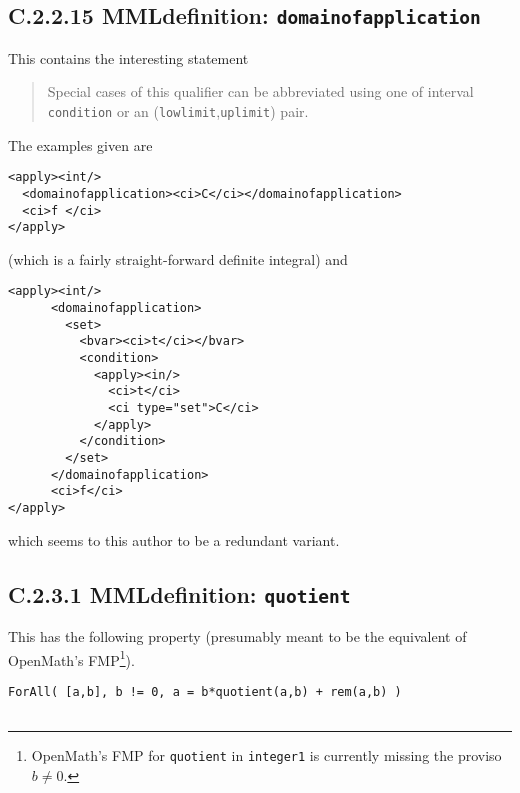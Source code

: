 \documentclass{llncs}
\begin{document}
{\subsection{C.2.2.15 MMLdefinition: {\tt domainofapplication}}\label{C2215}
This contains the interesting statement
\begin{quotation}\noindent
Special cases of this qualifier can be abbreviated using one of interval
{\tt condition} or an ({\tt lowlimit},{\tt uplimit}) pair.
\end{quotation}
The examples given are
\begin{lstlisting}[language=MathML2]
<apply><int/>
  <domainofapplication><ci>C</ci></domainofapplication>
  <ci>f </ci>
</apply>
\end{lstlisting}
(which is a fairly straight-forward definite integral) and
\begin{lstlisting}[language=MathML2]
<apply><int/>
      <domainofapplication>
        <set>
          <bvar><ci>t</ci></bvar>
          <condition>
            <apply><in/>
              <ci>t</ci>
              <ci type="set">C</ci>
            </apply>
          </condition>
        </set>
      </domainofapplication>
      <ci>f</ci>
</apply>
\end{lstlisting}
which seems to this author to be a redundant variant. 
\subsection{C.2.3.1 MMLdefinition: {\tt quotient}}\label{C231}
This has the following property (presumably meant to be the equivalent of
OpenMath's FMP\footnote{OpenMath's FMP for {\tt quotient} in {\tt integer1} is
currently missing the proviso $b\ne0$.}).
\begin{lstlisting}[language=MathML2]
ForAll( [a,b], b != 0, a = b*quotient(a,b) + rem(a,b) )


\end{lstlisting}}
\end{document}
